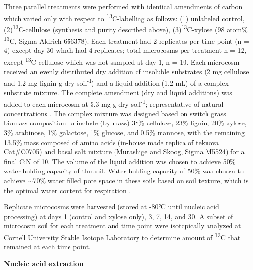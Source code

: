 Three parallel treatments were performed with identical amendments of carbon which varied only with respect to \textsuperscript{13}C-labelling as follows: (1) unlabeled control,(2)\textsuperscript{13}C-cellulose (synthesis and purity described above), (3)\textsuperscript{13}C-xylose (98 atom\% \textsuperscript{13}C, Sigma Aldrich 666378). Each treatment had 2 replicates per time point (n = 4) except day 30 which had 4 replicates; total microcosms per treatment n = 12, except \textsuperscript{13}C-cellulose which was not sampled at day 1, n = 10. Each microcosm received an evenly distributed dry addition of insoluble substrates (2 mg cellulose and 1.2 mg lignin g dry soil\textsuperscript{-1}) and a liquid addition (1.2 mL) of a complex substrate mixture. The complete amendment (dry and liquid additions) was added to each microcosm at 5.3 mg g dry soil\textsuperscript{-1}; representative of natural concentrations \cite{Schneckenberger_2008}. The complex mixture was designed based on switch grass biomass composition \cite{Yan_2010,David_2010} to include (by mass) 38\% cellulose, 23\% lignin, 20\% xylose, 3\% arabinose, 1\% galactose, 1\% glucose, and 0.5\% mannose, with the remaining 13.5\% mass composed of amino acids (in-house made replica of teknova Cat#C0705) and basal salt mixture (Murashige and Skoog, Sigma M5524) for a final C:N of 10. The volume of the liquid addition was chosen to achieve 50\% water holding capacity of the soil. Water holding capacity of 50\% was chosen to achieve $\sim$70\% water filled pore space in these soils based on soil texture, which is the optimal water content for respiration \cite{Linn_1984,Linn_1984}.

Replicate microcosms were harvested (stored at -80°C until nucleic acid processing) at days 1 (control and xylose only), 3, 7, 14, and 30. A subset of microcosm soil for each treatment and time point were isotopically analyzed at Cornell University Stable Isotope Laboratory to determine amount of \textsuperscript{13}C that remained at each time point.   

\textbf{Nucleic acid extraction}

